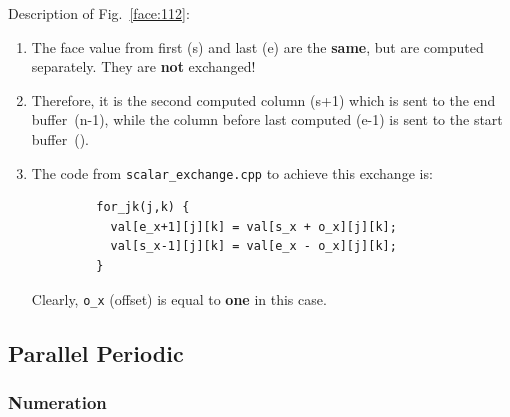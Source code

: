 Description of Fig.~\ref{face:112}:
\begin{enumerate}
  \item The face value from first ({\sf s}) and last ({\sf e}) are the 
        {\bf same}, but are computed separately. They are {\bf not} exchanged!
  \item Therefore, it is the second computed column ({\sf s+1}) which is sent 
        to the end buffer~({\sf n-1}), while the column before last computed 
        ({\sf e-1}) is sent to the start buffer~({}).
  \item The code from {\tt scalar\_exchange.cpp} to achieve this exchange is:
        \begin{verbatim}
         for_jk(j,k) {
           val[e_x+1][j][k] = val[s_x + o_x][j][k];
           val[s_x-1][j][k] = val[e_x - o_x][j][k];
         }
        \end{verbatim}
        Clearly, {\tt o\_x} (offset) is equal to {\bf one} in this case.
\end{enumerate}

\subsection{Parallel Periodic}

\subsubsection{Numeration}

